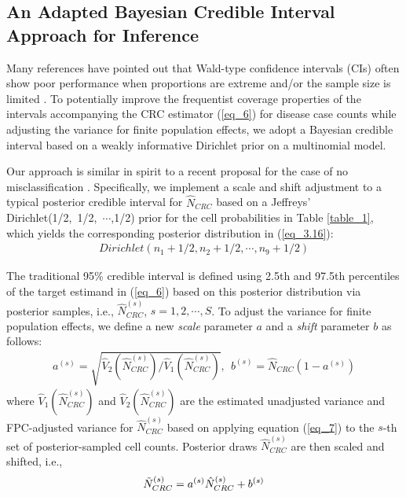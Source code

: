 \documentclass[useAMS,usenatbib,referee]{biom}
\begin{document}
\subsection{An Adapted Bayesian Credible Interval Approach for Inference}

Many references have pointed out that Wald-type confidence intervals (CIs) often show poor performance when proportions are extreme and/or the sample size is limited \citep{Ghosh1979,Blyth1983,Agresti1998,Brown2001}. To potentially improve the frequentist coverage properties of the intervals accompanying the CRC estimator (\ref{eq_6}) for disease case counts while adjusting the variance for finite population effects, we adopt a Bayesian credible interval based on a weakly informative Dirichlet prior on a multinomial model.

Our approach is similar in spirit to a recent proposal for the case of no misclassification \citep{Lyles2022b}. Specifically, we implement a scale and shift adjustment to a typical posterior credible interval for $\hat{N}_{CRC}$ based on a Jeffreys' Dirichlet(1/2,~1/2,~$\cdots$,1/2) prior for the cell probabilities in Table \ref{table_1}, which yields the corresponding posterior distribution in (\ref{eq_3.16}):
\begin{align}
    Dirichlet(n_1+1/2, n_2+1/2, \cdots, n_9+1/2) \label{eq_3.16}
\end{align}

The traditional 95\% credible interval is defined using 2.5th and 97.5th percentiles of the target estimand in (\ref{eq_6}) based on this posterior distribution via posterior samples, i.e., $\hat{N}_{CRC}^{(s)}$, $s=1,2,\cdots,S$. To adjust the variance for finite population effects, we define a new \textit{scale} parameter $a$ and a \textit{shift} parameter $b$ as follows:
\begin{align}
    a^{(s)} = \sqrt{\hat{V}_{2}(\hat{N}_{CRC}^{(s)})/\hat{V}_{1}(\hat{N}_{CRC}^{(s)})}, ~~b^{(s)}=\hat{N}_{CRC}(1-a^{(s)}) \label{eq_3.17}
\end{align}
where $\hat{V}_{1}(\hat{N}_{CRC}^{(s)})$ and $\hat{V}_{2}(\hat{N}_{CRC}^{(s)})$ are the estimated unadjusted variance and FPC-adjusted variance for $\hat{N}_{CRC}^{(s)}$ based on applying equation (\ref{eq_7}) to the $s$-th set of posterior-sampled cell counts. Posterior draws $\hat{N}_{CRC}^{(s)}$ are then scaled and shifted, i.e.,
\begin{align}
    \Tilde{N}_{CRC}^{(s)} = a^{(s)}\hat{N}_{CRC}^{(s)} + b^{(s)} \label{eq_11}
\end{align}
\end{document}
